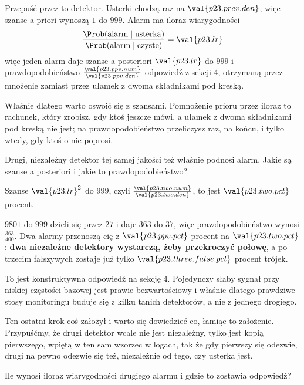 \begin{fr}
Przepuść przez to detektor. Usterki chodzą raz na $\val{p23.prev.den}$, więc
szanse a priori wynoszą $1$ do $999$. Alarm ma iloraz wiarygodności
\[ \frac{\Prob(\text{alarm} \mid \text{usterka})}
        {\Prob(\text{alarm} \mid \text{czyste})} = \val{p23.lr} \]
więc jeden alarm daje szanse a posteriori $\val{p23.lr}$ do $999$ i
prawdopodobieństwo $\frac{\val{p23.ppv.num}}{\val{p23.ppv.den}}$ \dash{}
odpowiedź z sekcji 4, otrzymaną przez mnożenie zamiast przez ułamek z dwoma
składnikami pod kreską.

Właśnie dlatego warto oswoić się z szansami. Pomnożenie prioru przez iloraz to
rachunek, który zrobisz, gdy ktoś jeszcze mówi, a ułamek z dwoma składnikami
pod kreską nie jest; na prawdopodobieństwo przeliczysz raz, na końcu, i tylko
wtedy, gdy ktoś o nie poprosi.

Drugi, niezależny detektor tej samej jakości też właśnie podnosi alarm. Jakie
są szanse a posteriori i jakie to prawdopodobieństwo?
\dotline
\nextframe
\end{fr}

\begin{fr}
\begin{ansblock}
Szanse $\val{p23.lr}^{2}$ do $999$, czyli
$\frac{\val{p23.two.num}}{\val{p23.two.den}}$, to jest $\val{p23.two.pct}$
procent.
\end{ansblock}

$9801$ do $999$ dzieli się przez $27$ i daje $363$ do $37$, więc
prawdopodobieństwo wynosi $\frac{363}{400}$. Dwa alarmy przenoszą cię z
$\val{p23.ppv.pct}$ procent na $\val{p23.two.pct}$: \textbf{dwa niezależne
detektory wystarczą, żeby przekroczyć połowę}, a po trzecim
fałszywych zostaje już tylko $\val{p23.three.false.pct}$ procent trójek.

To jest konstruktywna odpowiedź na sekcję 4. Pojedynczy słaby sygnał przy
niskiej częstości bazowej jest prawie bezwartościowy i właśnie dlatego
prawdziwe stosy monitoringu buduje się z kilku tanich detektorów, a nie z
jednego drogiego.

\end{fr}

\begin{fr}
Ten ostatni krok coś założył i warto się dowiedzieć co, łamiąc to założenie.
Przypuśćmy, że drugi detektor wcale nie jest niezależny, tylko jest kopią
pierwszego, wpiętą w ten sam wzorzec w logach, tak że gdy pierwszy się odezwie,
drugi na pewno odezwie się też, niezależnie od tego, czy usterka jest.

Ile wynosi iloraz wiarygodności drugiego alarmu i gdzie to zostawia odpowiedź?
\dotline
\nextframe
\end{fr}

